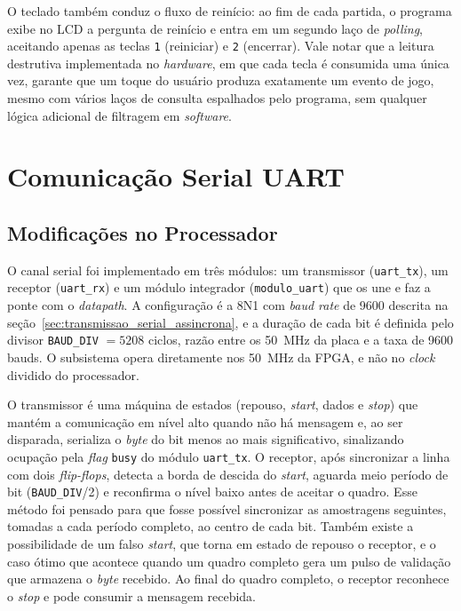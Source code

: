 \documentclass[
	12pt,
	oneside,
	a4paper,
	english,
	french,
	spanish,
	brazil,
	]{abntex2}
\begin{document}
O teclado também conduz o fluxo de reinício: ao fim de cada partida, o programa exibe no LCD a pergunta de reinício e entra em um segundo laço de \emph{polling}, aceitando apenas as teclas \texttt{1} (reiniciar) e \texttt{2} (encerrar). Vale notar que a leitura destrutiva implementada no \emph{hardware}, em que cada tecla é consumida uma única vez, garante que um toque do usuário produza exatamente um evento de jogo, mesmo com vários laços de consulta espalhados pelo programa, sem qualquer lógica adicional de filtragem em \emph{software}.

\section{Comunicação Serial UART}

\subsection{Modificações no Processador}
\label{sec:uart_processador}

O canal serial foi implementado em três módulos: um transmissor (\texttt{uart\_tx}), um receptor (\texttt{uart\_rx}) e um módulo integrador (\texttt{modulo\_uart}) que os une e faz a ponte com o \emph{datapath}. A configuração é a 8N1 com \emph{baud rate} de 9600 descrita na seção~\ref{sec:transmissao_serial_assincrona}, e a duração de cada bit é definida pelo divisor \texttt{BAUD\_DIV} $= 5208$ ciclos, razão entre os 50~MHz da placa e a taxa de 9600 bauds. O subsistema opera diretamente nos 50~MHz da FPGA, e não no \emph{clock} dividido do processador.

O transmissor é uma máquina de estados (repouso, \emph{start}, dados e \emph{stop}) que mantém a comunicação em nível alto quando não há mensagem e, ao ser disparada, serializa o \emph{byte} do bit menos ao mais significativo, sinalizando ocupação pela \emph{flag} \texttt{busy} do módulo \texttt{uart\_tx}. O receptor, após sincronizar a linha com dois \emph{flip-flops}, detecta a borda de descida do \emph{start}, aguarda meio período de bit (\texttt{BAUD\_DIV}/2) e reconfirma o nível baixo antes de aceitar o quadro. Esse método foi pensado para que fosse possível sincronizar as amostragens seguintes, tomadas a cada período completo, ao centro de cada bit. Também existe a possibilidade de um falso \emph{start}, que torna em estado de repouso o receptor, e o caso ótimo que acontece quando um quadro completo gera um pulso de validação que armazena o \emph{byte} recebido. Ao final do quadro completo, o receptor reconhece o \emph{stop} e pode consumir a mensagem recebida.
\end{document}
